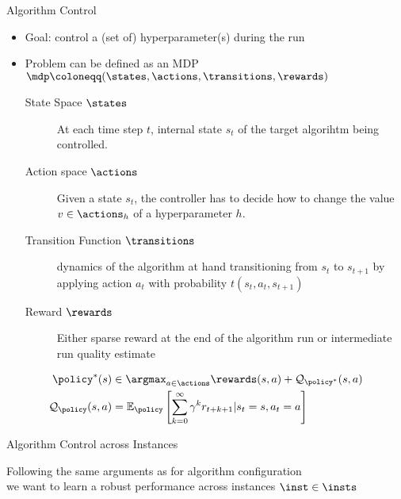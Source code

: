 \begin{frame}[c]{Algorithm Control }

\begin{itemize}
	\item Goal: control a (set of) hyperparameter(s) during the run
	\item Problem can be defined as an MDP $\mdp\coloneqq(\states,\actions,\transitions,\rewards)$
	\begin{description}
		\item[State Space $\states$] At each time step $t$, internal state $s_t$ of the target algorihtm being controlled.
		\item[Action space $\actions$] Given a state $s_t$, the controller has to decide how to change the value $v\in\actions_h$
		of a hyperparameter $h$.
		\item[Transition Function $\transitions$] dynamics of the algorithm at hand transitioning from $s_t$ to $s_{t+1}$ by applying action $a_t$ with probability $t(s_t, a_t, s_{t+1})$
		\item[Reward $\rewards$] Either sparse reward at the end of the algorithm run or intermediate run quality estimate
		
	\end{description}
\end{itemize}

\pause

\vspace*{-0.5cm}            
\begin{align}
\policy^*(s)&\in
\argmax_{a\in\actions} \rewards(s,a)+\mathcal{Q}_{\policy^*}(s,a) \nonumber\\
\mathcal{Q}_{\policy}(s,a)&=
\mathbb{E}_{\policy}\left[\sum_{k=0}^\infty\gamma^k r_{t+k+1}| s_t=s, a_t=a\right]\nonumber
\end{align}

\end{frame}

\begin{frame}[c]{Algorithm Control across Instances }



\bigskip

Following the same arguments as for algorithm configuration\\
we want to learn a \alert{robust performance across instances $\inst \in \insts$}

\end{frame}

